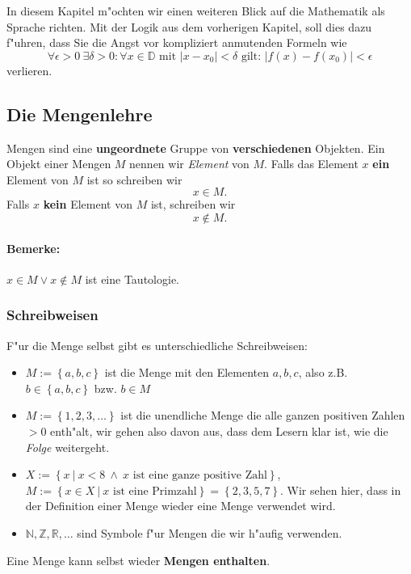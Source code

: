 In diesem Kapitel m"ochten wir einen weiteren Blick auf die Mathematik als Sprache richten. Mit der Logik aus dem vorherigen Kapitel, soll dies dazu f"uhren, dass Sie die Angst vor kompliziert anmutenden Formeln wie
\begin{equation*}
\forall \epsilon > 0 \ \exists \delta > 0 : \forall x \in \mathbb{D} \text{ mit } \left|x - x_0 \right| < \delta \text{ gilt: } \left| f(x) - f(x_0) \right| < \epsilon 
\end{equation*}
verlieren.

\subsection{Die Mengenlehre}
Mengen sind eine \textbf{ungeordnete} Gruppe von \textbf{verschiedenen} Objekten. Ein Objekt einer Mengen $M$ nennen wir \textit{Element} von $M$. Falls das Element $x$ \textbf{ein} Element von $M$ ist so schreiben wir 
\begin{equation*}
x \in M.
\end{equation*}
Falls $x$ \textbf{kein} Element von $M$ ist, schreiben wir
\begin{equation*}
x \notin M.
\end{equation*}

\paragraph{Bemerke:} $x \in M \lor x \notin M$ ist eine Tautologie.

\subsubsection{Schreibweisen}
F"ur die Menge selbst gibt es unterschiedliche Schreibweisen:
\begin{itemize}
\item $M := \left\{a, b, c\right\}$ ist die Menge mit den Elementen $a,b,c$, also z.B. $b \in  \left\{a, b, c\right\}$ bzw. $b \in M$
\item $M := \left\{1, 2, 3, \ldots \right\}$ ist die unendliche Menge die alle ganzen positiven Zahlen $> 0$ enth"alt, wir gehen also davon aus, dass dem Lesern klar ist, wie die \textit{Folge} weitergeht.
\item $X:= \left\{x \ | \ x < 8 \ \land \ x \text{ ist eine ganze positive Zahl} \right\}$,\\$M := \left\{x \in X \ | \ x \text{ ist eine Primzahl} \right\} = \left\{2, 3, 5, 7\right\}$. Wir sehen hier, dass in der Definition einer Menge wieder eine Menge verwendet wird.
\item $\mathbb{N}, \mathbb{Z}, \mathbb{R}, \ldots$ sind Symbole f"ur Mengen die wir h"aufig verwenden.
\end{itemize}
Eine Menge kann selbst wieder \textbf{Mengen enthalten}. 


